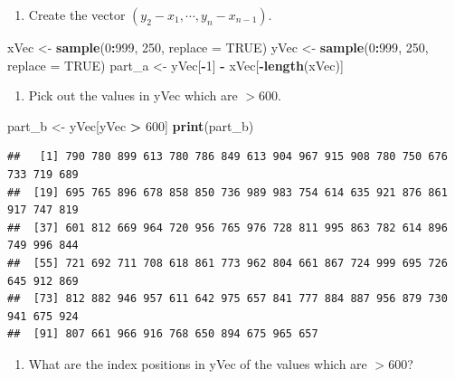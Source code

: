 \documentclass[
]{article}
\newenvironment{Shaded}{\begin{snugshade}}{\end{snugshade}}
\newcommand{\AttributeTok}[1]{\textcolor[rgb]{0.13,0.29,0.53}{#1}}
\newcommand{\ConstantTok}[1]{\textcolor[rgb]{0.56,0.35,0.01}{#1}}
\newcommand{\DecValTok}[1]{\textcolor[rgb]{0.00,0.00,0.81}{#1}}
\newcommand{\FunctionTok}[1]{\textcolor[rgb]{0.13,0.29,0.53}{\textbf{#1}}}
\newcommand{\NormalTok}[1]{#1}
\newcommand{\OtherTok}[1]{\textcolor[rgb]{0.56,0.35,0.01}{#1}}
\newcommand{\SpecialCharTok}[1]{\textcolor[rgb]{0.81,0.36,0.00}{\textbf{#1}}}
\providecommand{\tightlist}{%
  \setlength{\itemsep}{0pt}\setlength{\parskip}{0pt}}
\begin{document}
\begin{enumerate}
\def\labelenumi{(\alph{enumi})}
\tightlist
\item
  Create the vector \((y_2 - x_1, \cdots, y_n - x_{n-1}).\)
\end{enumerate}

\begin{Shaded}
\begin{Highlighting}[]
\NormalTok{xVec }\OtherTok{\textless{}{-}} \FunctionTok{sample}\NormalTok{(}\DecValTok{0}\SpecialCharTok{:}\DecValTok{999}\NormalTok{, }\DecValTok{250}\NormalTok{, }\AttributeTok{replace =} \ConstantTok{TRUE}\NormalTok{)}
\NormalTok{yVec }\OtherTok{\textless{}{-}} \FunctionTok{sample}\NormalTok{(}\DecValTok{0}\SpecialCharTok{:}\DecValTok{999}\NormalTok{, }\DecValTok{250}\NormalTok{, }\AttributeTok{replace =} \ConstantTok{TRUE}\NormalTok{)}
\NormalTok{part\_a }\OtherTok{\textless{}{-}}\NormalTok{ yVec[}\SpecialCharTok{{-}}\DecValTok{1}\NormalTok{] }\SpecialCharTok{{-}}\NormalTok{ xVec[}\SpecialCharTok{{-}}\FunctionTok{length}\NormalTok{(xVec)]}
\end{Highlighting}
\end{Shaded}

\begin{enumerate}
\def\labelenumi{(\alph{enumi})}
\setcounter{enumi}{1}
\tightlist
\item
  Pick out the values in yVec which are \(> 600\).
\end{enumerate}

\begin{Shaded}
\begin{Highlighting}[]
\NormalTok{part\_b }\OtherTok{\textless{}{-}}\NormalTok{ yVec[yVec }\SpecialCharTok{\textgreater{}} \DecValTok{600}\NormalTok{]}
\FunctionTok{print}\NormalTok{(part\_b)}
\end{Highlighting}
\end{Shaded}

\begin{verbatim}
##   [1] 790 780 899 613 780 786 849 613 904 967 915 908 780 750 676 733 719 689
##  [19] 695 765 896 678 858 850 736 989 983 754 614 635 921 876 861 917 747 819
##  [37] 601 812 669 964 720 956 765 976 728 811 995 863 782 614 896 749 996 844
##  [55] 721 692 711 708 618 861 773 962 804 661 867 724 999 695 726 645 912 869
##  [73] 812 882 946 957 611 642 975 657 841 777 884 887 956 879 730 941 675 924
##  [91] 807 661 966 916 768 650 894 675 965 657
\end{verbatim}

\begin{enumerate}
\def\labelenumi{(\alph{enumi})}
\setcounter{enumi}{2}
\tightlist
\item
  What are the index positions in yVec of the values which are
  \(> 600\)?
\end{enumerate}
\end{document}
